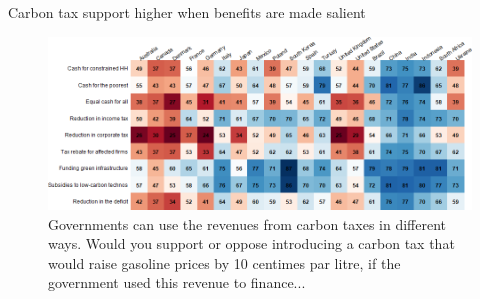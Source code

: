 	
	

\begin{frame}{Carbon tax support higher when benefits are made salient}%
	\begin{figure}[h!]
	\centering
	\caption{Governments can use the revenues from carbon taxes in different ways. Would you support or oppose introducing a carbon tax that would raise gasoline prices by 10 centimes par litre, if the government used this revenue to finance...}
	\vspace{-.2cm}
	\includegraphics[width=\textwidth]{../figures/country_comparison/tax_positive_countries.png}
	\end{figure}
\end{frame}
		
